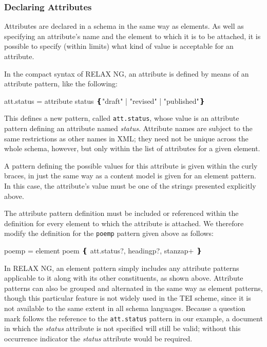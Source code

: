 \subsubsection[{Declaring Attributes}]{Declaring Attributes}\label{SG-att}\par
Attributes are declared in a schema in the same way as elements. As well as specifying an attribute's name and the element to which it is to be attached, it is possible to specify (within limits) what kind of value is acceptable for an attribute.\par
In the compact syntax of RELAX NG, an attribute is defined by means of an attribute pattern, like the following: \par\hfill\bgroup\exampleFont\vskip 10pt\begin{shaded}
\obeyspaces att.status = attribute status ❴"draft" | "revised" | "published"❵\end{shaded}
\par\egroup 
 This defines a new pattern, called \texttt{att.status}, whose value is an attribute pattern defining an attribute named {\itshape status}. Attribute names are subject to the same restrictions as other names in XML; they need not be unique across the whole schema, however, but only within the list of attributes for a given element.\par
A pattern defining the possible values for this attribute is given within the curly braces, in just the same way as a content model is given for an element pattern. In this case, the attribute's value must be one of the strings presented explicitly above. \par
The attribute pattern definition must be included or referenced within the definition for every element to which the attribute is attached. We therefore modify the definition for the \texttt{poem\textunderscore p} pattern given above as follows: \par\hfill\bgroup\exampleFont\vskip 10pt\begin{shaded}
\obeyspaces poem\textunderscore p = element poem ❴ att.status?, heading\textunderscore p?, stanza\textunderscore p+ ❵\end{shaded}
\par\egroup 
 In RELAX NG, an element pattern simply includes any attribute patterns applicable to it along with its other constituents, as shown above. Attribute patterns can also be grouped and alternated in the same way as element patterns, though this particular feature is not widely used in the TEI scheme, since it is not available to the same extent in all schema languages. Because a question mark follows the reference to the \texttt{att.status} pattern in our example, a document in which the {\itshape status} attribute is not specified will still be valid; without this occurrence indicator the {\itshape status} attribute would be required.\par
